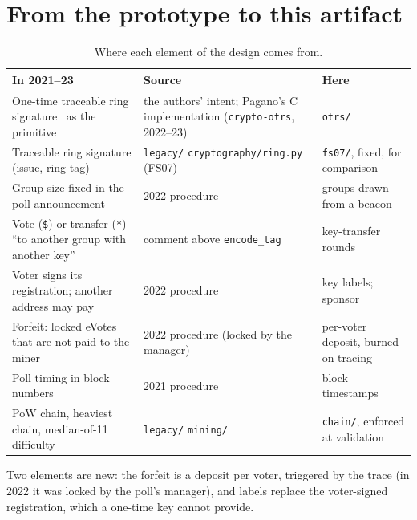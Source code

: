 \documentclass[11pt,a4paper]{article}
\theoremstyle{definition}
\begin{document}
\section{From the prototype to this artifact}
\label{sec:legacy}

\begin{table}[h]
\centering
\caption{Where each element of the design comes from.}
\label{tab:origin}
\small
\begin{tabularx}{\textwidth}{X X X}
\toprule
In 2021--23 & Source & Here \\
\midrule
One-time traceable ring signature~\cite{SZ21} as the primitive & the authors' intent; Pagano's C implementation (\texttt{crypto-otrs}, 2022--23) & \texttt{otrs/} \\
Traceable ring signature (issue, ring tag) & \texttt{legacy/} \texttt{cryptography/ring.py} (FS07) & \texttt{fs07/}, fixed, for comparison \\
Group size fixed in the poll announcement & 2022 procedure & groups drawn from a beacon \\
Vote (\texttt{\$}) or transfer (\texttt{*}) ``to another group with another key'' & comment above \texttt{encode\_tag} & key-transfer rounds \\
Voter signs its registration; another address may pay & 2022 procedure & key labels; sponsor \\
Forfeit: locked eVotes that are not paid to the miner & 2022 procedure (locked by the manager) & per-voter deposit, burned on tracing \\
Poll timing in block numbers & 2021 procedure & block timestamps \\
PoW chain, heaviest chain, median-of-11 difficulty & \texttt{legacy/} \texttt{mining/} & \texttt{chain/}, enforced at validation \\
\bottomrule
\end{tabularx}
\end{table}

Two elements are new: the forfeit is a deposit per voter, triggered by the
trace (in 2022 it was locked by the poll's manager), and labels replace
the voter-signed registration, which a one-time key cannot provide.
\end{document}
